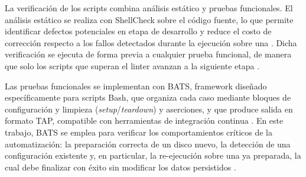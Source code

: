 La verificación de los scripts combina análisis estático y pruebas funcionales. El análisis estático se realiza con ShellCheck sobre el código fuente, lo que permite identificar defectos potenciales en etapa de desarrollo y reduce el costo de corrección respecto a los fallos detectados durante la ejecución sobre una \vm{} \parencite{shellcheck}. Dicha verificación se ejecuta de forma previa a cualquier prueba funcional, de manera que solo los scripts que superan el linter avanzan a la siguiente etapa \parencite{bash_best_practices}.

Las pruebas funcionales se implementan con BATS, framework diseñado específicamente para scripts Bash, que organiza cada caso mediante bloques de configuración y limpieza (\textit{setup}/\textit{teardown}) y aserciones, y que produce salida en formato TAP, compatible con herramientas de integración continua \parencite{bats_testing}. En este trabajo, BATS se emplea para verificar los comportamientos críticos de la automatización: la preparación correcta de un disco nuevo, la detección de una configuración existente y, en particular, la re-ejecución sobre una \vm{} ya preparada, la cual debe finalizar con éxito sin modificar los datos persistidos \parencite{idempotency_concept}.
